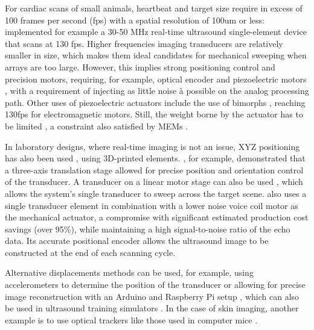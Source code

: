 \documentclass{article}
\begin{document}
For cardiac scans of small animals, heartbeat and target size require in excess of 100 frames per second (fps) with a spatial resolution of 100um or less:  \cite{lei_high-frame_nodate} implemented for example a 30-50 MHz real-time ultrasound single-element device that scans at 130 fps. Higher frequencies imaging transducers are  relatively smaller in size, which makes them ideal candidates for mechanical sweeping when arrays are too large. However, this implies strong positioning control and precision motors, requiring, for example, optical encoder and  piezoelectric motors \cite{carotenuto_very_2004}, with a requirement of injecting as little noise à possible on the analog processing path. Other uses of piezoelectric actuators include the use of bimorphs \cite{bezanson_low-cost_2011}, reaching 130fps for electromagnetic motors. Still, the weight borne by the actuator has to be limited \cite{brown_low_2013, huang_novel_2015}, a constraint also satisfied by MEMs \cite{choi_versatile_2020}.

In laboratory designs, where real-time imaging is not an issue, XYZ positioning has also been used \cite{svilainis_electronics_2014, wang_high_2019, xu_enabling_2019}, using 3D-printed elements. \cite{bottenus_feasibility_2016}, for example, demonstrated that a three-axis translation stage allowed for precise position and orientation control of the transducer. A transducer on a linear motor stage can also be used  \cite{qiu_programmable_2011,govindan_reconfigurable_2015, soto-cajiga_fpga-based_2012}, which allows the system's single transducer to sweep across the target scene. \cite{smith_design_2015} also uses a single transducer element in combination with a lower noise voice coil motor as the mechanical actuator, a compromise with significant estimated production cost savings (over 95\%), while maintaining a high signal-to-noise ratio of the echo data. Its accurate positional encoder allows the ultrasound image to be constructed at the end of each scanning cycle.

Alternative displacements methods can be used, for example, using accelerometers to determine the position of the transducer  \cite{sobhani_portable_2016} or allowing for precise image reconstruction with an Arduino and Raspberry Pi setup \cite{herickhoff_low-cost_2019}, which can also be used in ultrasound training simulators \cite{farsoni_low-cost_2017}. In the case of skin imaging, another example is to use optical trackers like those used in computer mice \cite{zhang_free-hand_2019, poulsen_optical_2005, herickhoff_low-cost_2018}.
\end{document}
